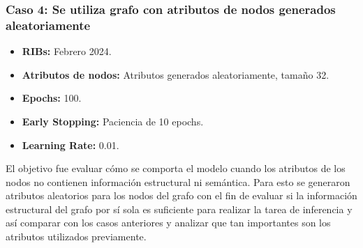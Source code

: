 
















\subsubsection{Caso 4: Se utiliza grafo con atributos de nodos generados aleatoriamente}



\begin{itemize}
    \item \textbf{RIBs:} Febrero 2024.
    \item \textbf{Atributos de nodos:} Atributos generados aleatoriamente, tamaño 32.
    \item \textbf{Epochs:} 100. 
    \item \textbf{Early Stopping:} Paciencia de 10 epochs.
    \item \textbf{Learning Rate:} 0.01.
\end{itemize}


El objetivo fue evaluar cómo se comporta el modelo cuando los atributos de los nodos no contienen información estructural ni semántica. Para esto se generaron atributos aleatorios para los nodos del grafo con el fin de evaluar si la información estructural del grafo por sí sola es suficiente para realizar la tarea de inferencia y así comparar con los casos anteriores y analizar que tan importantes son los atributos utilizados previamente.\\




